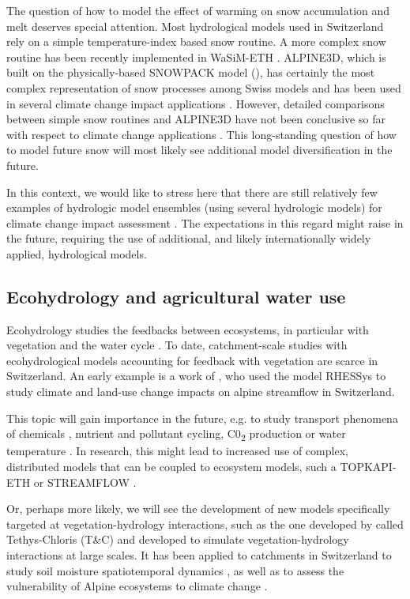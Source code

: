 \documentclass[10pt,a4paper]{article}
\begin{document}
The question of how to model the effect of warming on snow accumulation
and melt deserves special attention. Most hydrological models used in
Switzerland rely on a simple temperature-index based snow routine. A
more complex snow routine has been recently implemented in 
WaSiM-ETH \citep{Thornton2019}. ALPINE3D, which is built on the
physically-based SNOWPACK model (\citealt{Lehning2002,Bartelt_2002,Bartelt2002,Lehning_2002}), 
has certainly the most complex representation of snow processes among Swiss 
models and has been used in several climate change impact
applications \citep{Bavay2009,Bavay2013,Marty2017}. However, detailed comparisons between
simple snow routines and ALPINE3D have not been conclusive so far with
respect to climate change applications \citep{Kobierska2011,Shakoor2018}. This
long-standing question of how to model future snow will most likely see
additional model diversification in the future. 

In this context, we would like to stress here that there are still
relatively few examples of hydrologic model ensembles (using several
hydrologic models) for climate change impact
assessment \citep{Kobierska2011,Addor2014}. The expectations in this regard might
raise in the future, requiring the use of additional, and likely
internationally widely applied, hydrological models.

\subsection{Ecohydrology and agricultural water use}
\label{sec:application:echohydrology}

Ecohydrology studies the feedbacks between ecosystems, in particular
with vegetation and the water cycle \citep{tague200}. To date,
catchment-scale studies with ecohydrological models accounting for
feedback with vegetation are scarce in Switzerland. An early example is
a work of \citet{zierl05}, who used the model RHESSys to study
climate and land-use change impacts on alpine streamflow in
Switzerland. 

This topic will gain importance in the future, e.g. to study transport
phenomena of chemicals \citep{queloz2015}, nutrient and pollutant
cycling, C0\textsubscript{2} production or water
temperature \citep{michel2020}. In research, this might lead to
increased use of complex, distributed models that can be coupled to
ecosystem models, such a TOPKAPI-ETH \citep{Pappas_2015} or
STREAMFLOW \citep{Gallice_2016}.

Or, perhaps more likely, we will see the development of new models
specifically targeted at vegetation-hydrology interactions, such as the
one developed by \citet{Fatichi2012,Fatichi2012a} called Tethys-Chloris (T\&C) and
developed to simulate vegetation-hydrology interactions at large scales.
It has been applied to catchments in Switzerland to study soil moisture
spatiotemporal dynamics \citep{Fatichi2015a}, as well as to assess the
vulnerability of Alpine ecosystems to climate change \citep{Mastrotheodoros2019}.
\end{document}
